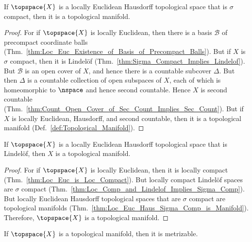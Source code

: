 \documentclass{article}                                                        %
\begin{document}
        \begin{theorem}
            \label{thm:Loc_Euc_Haus_Sigma_Comp_is_Manifold}%
            If $\topspace{X}$ is a locally Euclidean Hausdorff topological
            space that is $\sigma$ compact, then it is a topological manifold.
        \end{theorem}
        \begin{proof}
            For if $\topspace{X}$ is locally Euclidean, then there is a basis
            $\mathcal{B}$ of precompact coordinate balls
            (Thm.~\ref{thm:Loc_Euc_Existence_of_Basis_of_Precompact_Balls}).
            But if $X$ is $\sigma$ compact, then it is Lindel\"{o}f
            (Thm.~\ref{thm:Sigma_Compact_Implies_Lindelof}). But $\mathcal{B}$
            is an open cover of $X$, and hence there is a countable subcover
            $\Delta$. But then $\Delta$ is a countable collection of open
            subspaces of $X$, each of which is homeomorphic to
            $\nspace$ and hence second countable. Hence $X$ is second countable
            (Thm.~\ref{thm:Count_Open_Cover_of_Sec_Count_Implies_Sec_Count}).
            But if $X$ is locally Euclidean, Hausdorff, and second countable,
            then it is a topological manifold
            (Def.~\ref{def:Topological_Manifold}).
        \end{proof}
        \begin{theorem}
            \label{thm:Loc_Euc_Hausdorff_Lindelof_is_Manifold}%
            If $\topspace{X}$ is a locally Euclidean Hausdorff topological space
            that is Lindel\"{o}f, then $X$ is a topological manifold.
        \end{theorem}
        \begin{proof}
            For if $\topspace{X}$ is locally Euclidean, then it is locally
            compact (Thm.~\ref{thm:Loc_Euc_is_Loc_Compact}). But locally compact
            Lindel\"{o}f spaces are $\sigma$ compact
            (Thm.~\ref{thm:Loc_Comp_and_Lindelof_Implies_Sigma_Comp}). But
            locally Euclidean Hausdorff topological spaces that are $\sigma$
            compact are topological manifolds
            (Thm.~\ref{thm:Loc_Euc_Haus_Sigma_Comp_is_Manifold}). Therefore,
            $\topspace{X}$ is a topological manifold.
        \end{proof}
        \begin{theorem}
            \label{thm:Top_Man_is_Metrizable}%
            If $\topspace{X}$ is a topological manifold, then it is metrizable.
        \end{theorem}
\end{document}
